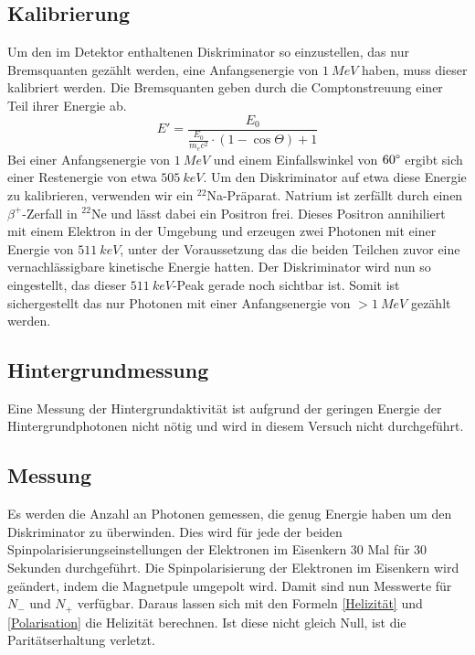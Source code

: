 \subsection{Kalibrierung}
Um den im Detektor enthaltenen Diskriminator so einzustellen, das nur Bremsquanten gezählt werden, eine Anfangsenergie von $\SI{1}{MeV}$ haben, muss dieser kalibriert werden. Die Bremsquanten geben durch die Comptonstreuung einer Teil ihrer Energie ab. 
$$E' = \frac{E_0}{\frac{E_0}{m_ec^2}\cdot(1-\cos{\Theta})+1}$$
Bei einer Anfangsenergie von $\SI{1}{MeV}$ und einem Einfallswinkel von $60\degree$ ergibt sich einer Restenergie von etwa $\SI{505}{keV}$. Um den Diskriminator auf etwa diese Energie zu kalibrieren, verwenden wir ein $^{22}$Na-Präparat. Natrium ist zerfällt durch einen $\beta^+$-Zerfall in $^{22}$Ne und lässt dabei ein Positron frei. Dieses Positron annihiliert mit einem Elektron in der Umgebung und erzeugen zwei Photonen mit einer Energie von $\SI{511}{keV}$, unter der Voraussetzung das die beiden Teilchen zuvor eine vernachlässigbare kinetische Energie hatten. Der Diskriminator wird nun so eingestellt, das dieser $\SI{511}{keV}$-Peak gerade noch sichtbar ist. Somit ist sichergestellt das nur Photonen mit einer Anfangsenergie von $>\SI{1}{MeV}$ gezählt werden.
\subsection{Hintergrundmessung}
Eine Messung der Hintergrundaktivität ist aufgrund der geringen Energie der Hintergrundphotonen nicht nötig und wird in diesem Versuch nicht durchgeführt.
\subsection{Messung}
Es werden die Anzahl an Photonen gemessen, die genug Energie haben um den Diskriminator zu überwinden. Dies wird für jede der beiden Spinpolarisierungseinstellungen der Elektronen im Eisenkern 30 Mal für 30 Sekunden durchgeführt. Die Spinpolarisierung der Elektronen im Eisenkern wird geändert, indem die Magnetpule umgepolt wird. Damit sind nun Messwerte für $N_-$ und $N_+$ verfügbar. Daraus lassen sich mit den Formeln \ref{Helizität} und \ref{Polarisation} die Helizität berechnen. Ist diese nicht gleich Null, ist die Paritätserhaltung verletzt. 
